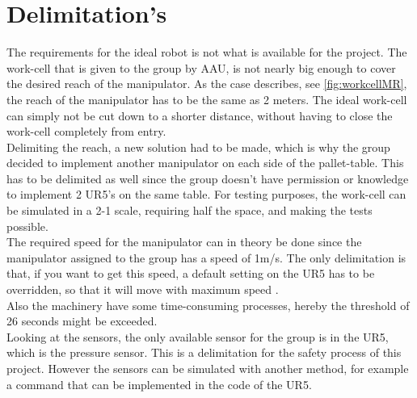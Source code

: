 \section{Delimitation's} \label{ch:Delimitations}

The requirements for the ideal robot is not what is available for the project. 
The work-cell that is given to the group by AAU, is not nearly big enough to cover the desired reach of the manipulator. As the case describes, see \ref{fig:workcellMR}, the reach of the manipulator has to be the same as 2 meters. The ideal work-cell can simply not be cut down to a shorter distance, without having to close the work-cell completely from entry.\\
Delimiting the reach, a new solution had to be made, which is why the group decided to implement another manipulator on each side of the pallet-table. This has to be delimited as well since the group doesn't have permission or knowledge to implement 2 UR5's on the same table.
For testing purposes, the work-cell can be simulated in a 2-1 scale, requiring half the space, and making the tests possible. \\
The required speed for the manipulator can in theory be done since the manipulator assigned to the group has a speed of 1m/s. The only delimitation is that, if you want to get this speed, a default setting on the UR5 has to be overridden, so that it will move with maximum speed \cite{UserManual}.\\
Also the machinery have some time-consuming processes, hereby the threshold of 26 seconds might be exceeded.\\
Looking at the sensors, the only available sensor for the group is in the UR5, which is the pressure sensor. This is a delimitation for the safety process of this project. However the sensors can be simulated with another method, for example a command that can be implemented in the code of the UR5.\\
